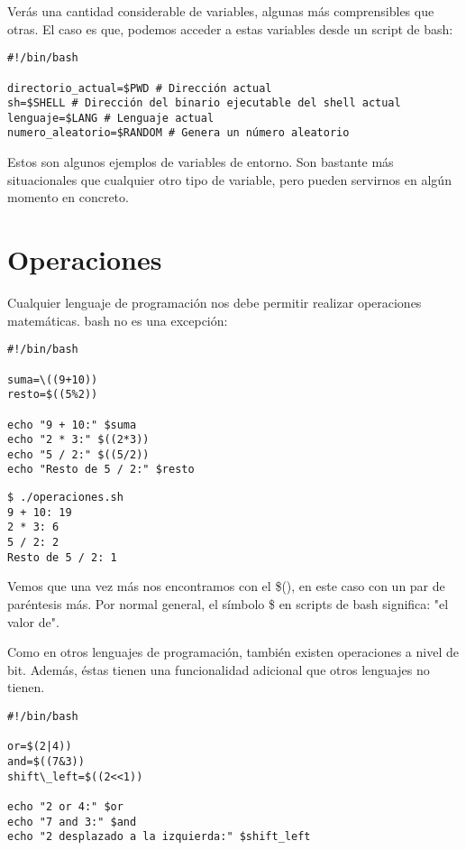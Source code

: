 Verás una cantidad considerable de variables, algunas más comprensibles que otras. El caso es que, podemos acceder a estas variables desde un script de bash:

\begin{tcolorbox-code}
\begin{lstlisting}
#!/bin/bash

directorio_actual=$PWD # Dirección actual
sh=$SHELL # Dirección del binario ejecutable del shell actual
lenguaje=$LANG # Lenguaje actual
numero_aleatorio=$RANDOM # Genera un número aleatorio
\end{lstlisting}
\end{tcolorbox-code}

Estos son algunos ejemplos de variables de entorno. Son bastante más situacionales que cualquier otro tipo de variable, pero pueden servirnos en algún momento en concreto.

\section{Operaciones}

Cualquier lenguaje de programación nos debe permitir realizar operaciones matemáticas. bash no es una excepción:

\begin{tcolorbox-code}
\begin{lstlisting}
#!/bin/bash

suma=\((9+10))
resto=$((5%2))

echo "9 + 10:" $suma
echo "2 * 3:" $((2*3))
echo "5 / 2:" $((5/2))
echo "Resto de 5 / 2:" $resto
\end{lstlisting}
\end{tcolorbox-code}

\begin{tcolorbox-code}
\begin{lstlisting}
$ ./operaciones.sh
9 + 10: 19
2 * 3: 6
5 / 2: 2
Resto de 5 / 2: 1
\end{lstlisting}
\end{tcolorbox-code}

Vemos que una vez más nos encontramos con el \$(), en este caso con un par de paréntesis más. Por normal general, el símbolo \$ en scripts de bash significa: "el valor de".

Como en otros lenguajes de programación, también existen operaciones a nivel de bit. Además, éstas tienen una funcionalidad adicional que otros lenguajes no tienen.

\begin{tcolorbox-code}
\begin{lstlisting}
#!/bin/bash

or=$(2|4))
and=$((7&3))
shift\_left=$((2<<1))

echo "2 or 4:" $or
echo "7 and 3:" $and
echo "2 desplazado a la izquierda:" $shift_left
\end{lstlisting}
\end{tcolorbox-code}

